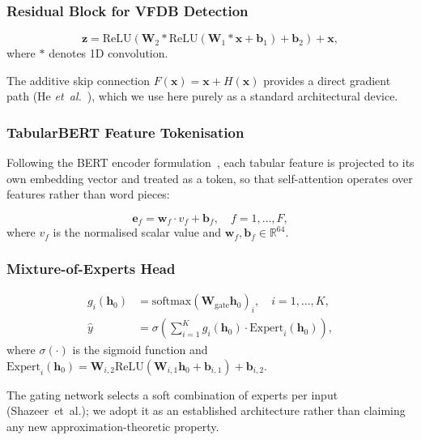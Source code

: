 \documentclass[AMA,STIX1COL,]{WileyNJD-v2}
\begin{document}
\subsubsection{Residual Block for VFDB Detection}

\begin{equation}
\mathbf{z} = \mathrm{ReLU}(\mathbf{W}_2 *
  \mathrm{ReLU}(\mathbf{W}_1 * \mathbf{x}+\mathbf{b}_1)+\mathbf{b}_2)
  + \mathbf{x},
\label{eq:residual}
\end{equation}
where $*$ denotes 1D convolution.

The additive skip connection $F(\mathbf{x})=\mathbf{x}+H(\mathbf{x})$
provides a direct gradient path (He \emph{et~al.}~\cite{he2016}), which we use here purely
as a standard architectural device.

\subsubsection{TabularBERT Feature Tokenisation}

Following the BERT encoder formulation~\cite{devlin2019}, each tabular
feature is projected to its own embedding vector and treated as a token,
so that self-attention operates over features rather than word pieces:

\begin{equation}
\mathbf{e}_f = \mathbf{w}_f \cdot v_f + \mathbf{b}_f,
\quad f=1,\ldots,F,
\label{eq:feat}
\end{equation}
where $v_f$ is the normalised scalar value and
$\mathbf{w}_f,\mathbf{b}_f\in\mathbb{R}^{64}$.

\subsubsection{Mixture-of-Experts Head}

\begin{align}
g_i(\mathbf{h}_0) &=
  \mathrm{softmax}(\mathbf{W}_{\mathrm{gate}}\mathbf{h}_0)_i,
  \quad i=1,\ldots,K, \label{eq:gate}\\
\hat{y} &= \sigma\!\left(
  \sum_{i=1}^K g_i(\mathbf{h}_0)\cdot\mathrm{Expert}_i(\mathbf{h}_0)
\right), \label{eq:moe}
\end{align}
where $\sigma(\cdot)$ is the sigmoid function and
$\mathrm{Expert}_i(\mathbf{h}_0)=\mathbf{W}_{i,2}
\mathrm{ReLU}(\mathbf{W}_{i,1}\mathbf{h}_0+\mathbf{b}_{i,1})+\mathbf{b}_{i,2}$.

The gating network selects a soft combination of experts per input
(Shazeer~et~al.); we adopt it as an established architecture rather
than claiming any new approximation-theoretic property.
\end{document}
